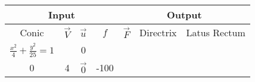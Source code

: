 \begin{tabular}{|c|c|c|c|c|c|c|}
\hline
\multicolumn{4}{|c|}{Input} & \multicolumn{3}{|c|}{Output} \\
\hline
Conic & $\vec{V}$ & $\vec{u}$ & $f$ & $\vec{F}$ & Directrix & Latus Rectum\\
\hline
$\frac{x^2}{4}+\frac{y^2}{25}=1$ &\myvec{25&0\\0&4}  &  $\vec{0}$  & -100 &  &  &  \\
\hline
\end{tabular}
